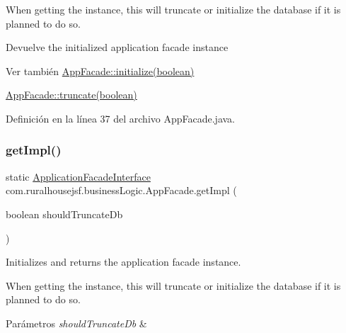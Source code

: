 When getting the instance, this will truncate or initialize the database if it is planned to do so.

\begin{DoxyReturn}{Devuelve}
the initialized application facade instance
\end{DoxyReturn}
\begin{DoxySeeAlso}{Ver también}
\mbox{\hyperlink{classcom_1_1ruralhousejsf_1_1business_logic_1_1_app_facade_a48252ec119a6bb16f5353df6ec6eff54}{App\+Facade\+::initialize(boolean)}} 

\mbox{\hyperlink{classcom_1_1ruralhousejsf_1_1business_logic_1_1_app_facade_a98aed1ed8a03c6a92e15121fed4eb452}{App\+Facade\+::truncate(boolean)}} 
\end{DoxySeeAlso}


Definición en la línea 37 del archivo App\+Facade.\+java.

\mbox{\label{classcom_1_1ruralhousejsf_1_1business_logic_1_1_app_facade_aa4bf7166aae19a2d640fd6ab8a0fff96}} 
\subsubsection{\texorpdfstring{getImpl()}{getImpl()}\hspace{0.1cm}{\footnotesize\ttfamily [2/3]}}
{\footnotesize\ttfamily static \mbox{\hyperlink{interfacecom_1_1ruralhousejsf_1_1business_logic_1_1_application_facade_interface}{Application\+Facade\+Interface}} com.\+ruralhousejsf.\+business\+Logic.\+App\+Facade.\+get\+Impl (\begin{DoxyParamCaption}\item[{boolean}]{should\+Truncate\+Db }\end{DoxyParamCaption})\hspace{0.3cm}{\ttfamily [static]}}

Initializes and returns the application facade instance. 

When getting the instance, this will truncate or initialize the database if it is planned to do so.


\begin{DoxyParams}{Parámetros}
{\em should\+Truncate\+Db} & \\
\hline
\end{DoxyParams}


